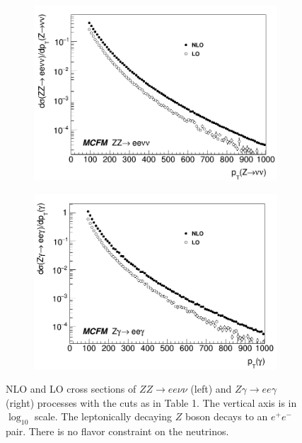 \documentclass[11pt,a4paper,openright,twoside]{report}
\begin{document}
\begin{figure}[H]
\centering
	\begin{subfigure}{0.49\textwidth}
		\includegraphics[width=\linewidth]{ZZ_xsec.png}
		\caption{}
		\label{subfig:ZeeZvv}
	\end{subfigure}	
	\begin{subfigure}{0.49\textwidth}
		\includegraphics[width=\linewidth]{Zg_xsec.png}
		\caption{}
		\label{subfig:Zeeg}	
	\end{subfigure}
	\caption{NLO and LO cross sections of $ZZ\to ee\nu\nu$ (left) and $Z\gamma\to ee\gamma$ (right) processes with the cuts as in Table 1. The vertical axis is in $\log_{10}$ scale. The leptonically decaying $Z$ boson decays to an $e^+e^-$ pair. There is no flavor constraint on the neutrinos.}
	\label{xsecs}
\end{figure}
\end{document}
